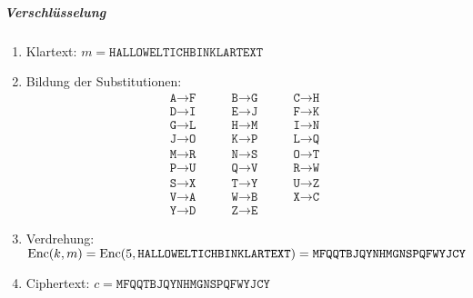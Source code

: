                     \subparagraph{Verschlüsselung}
	                    \begin{enumerate}
	                    	\item[] Klartext: \( m = \texttt{HALLOWELTICHBINKLARTEXT} \)
	                    	\item Bildung der Substitutionen:
		                    	\begin{equation*}
			                    	\begin{matrix*}
				                    	\texttt{A} \rightarrow \texttt{F} & \qquad \texttt{B} \rightarrow \texttt{G} & \qquad \texttt{C} \rightarrow \texttt{H} \\
				                    	\texttt{D} \rightarrow \texttt{I} & \qquad \texttt{E} \rightarrow \texttt{J} & \qquad \texttt{F} \rightarrow \texttt{K} \\
				                    	\texttt{G} \rightarrow \texttt{L} & \qquad \texttt{H} \rightarrow \texttt{M} & \qquad \texttt{I} \rightarrow \texttt{N} \\
				                    	\texttt{J} \rightarrow \texttt{O} & \qquad \texttt{K} \rightarrow \texttt{P} & \qquad \texttt{L} \rightarrow \texttt{Q} \\
				                    	\texttt{M} \rightarrow \texttt{R} & \qquad \texttt{N} \rightarrow \texttt{S} & \qquad \texttt{O} \rightarrow \texttt{T} \\
				                    	\texttt{P} \rightarrow \texttt{U} & \qquad \texttt{Q} \rightarrow \texttt{V} & \qquad \texttt{R} \rightarrow \texttt{W} \\
				                    	\texttt{S} \rightarrow \texttt{X} & \qquad \texttt{T} \rightarrow \texttt{Y} & \qquad \texttt{U} \rightarrow \texttt{Z} \\
				                    	\texttt{V} \rightarrow \texttt{A} & \qquad \texttt{W} \rightarrow \texttt{B} & \qquad \texttt{X} \rightarrow \texttt{C} \\
				                    	\texttt{Y} \rightarrow \texttt{D} & \qquad \texttt{Z} \rightarrow \texttt{E}
			                    	\end{matrix*}
			                    \end{equation*}
	                    	\item Verdrehung: \( \operatorname{Enc}(k, m) = \operatorname{Enc}(5, \texttt{HALLOWELTICHBINKLARTEXT}) = \texttt{MFQQTBJQYNHMGNSPQFWYJCY} \)
	                    	\item[] Ciphertext: \( c = \texttt{MFQQTBJQYNHMGNSPQFWYJCY} \)
	                    \end{enumerate}
                    
